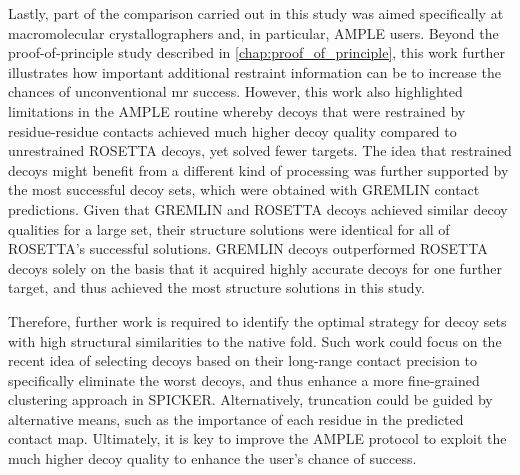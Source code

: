 Lastly, part of the comparison carried out in this study was aimed specifically at macromolecular crystallographers and, in particular, AMPLE users. Beyond the proof-of-principle study described in \cref{chap:proof_of_principle}, this work further illustrates how important additional restraint information can be to increase the chances of unconventional \gls{mr} success. However, this work also highlighted limitations in the AMPLE routine whereby decoys that were restrained by residue-residue contacts achieved much higher decoy quality compared to unrestrained ROSETTA decoys, yet solved fewer targets. The idea that restrained decoys might benefit from a different kind of processing was further supported by the most successful decoy sets, which were obtained with GREMLIN contact predictions. Given that GREMLIN and ROSETTA decoys achieved similar decoy qualities for a large set, their structure solutions were identical for all of ROSETTA’s successful solutions. GREMLIN decoys outperformed ROSETTA decoys solely on the basis that it acquired highly accurate decoys for one further target, and thus achieved the most structure solutions in this study. 

Therefore, further work is required to identify the optimal strategy for decoy sets with high structural similarities to the native fold. Such work could focus on the recent idea of selecting decoys based on their long-range contact precision \cite{De_Oliveira2017-gj, Ovchinnikov2017-nd} to specifically eliminate the worst decoys, and thus enhance a more fine-grained clustering approach in SPICKER. Alternatively, truncation could be guided by alternative means, such as the importance of each residue in the predicted contact map. Ultimately, it is key to improve the AMPLE protocol to exploit the much higher decoy quality to enhance the user’s chance of success.

